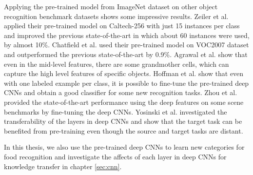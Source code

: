 Applying the pre-trained model from ImageNet dataset on other object recognition benchmark datasets shows some impressive results. Zeiler et al.  \cite{zeiler2014visualizing} applied their pre-trained model on Caltech-256 with just 15 instances per class and improved the previous state-of-the-art in which about 60 instances were used, by almost 10\%.
Chatfield et al.  \cite{Chatfield14} used their pre-trained model on VOC2007 dataset and outperformed the previous state-of-the-art by 0.9\%.
Agrawal et al. \cite{agrawal2014analyzing} show that even in the mid-level features, there are some grandmother cells, which can capture the high level features of specific objects. Hoffman et al. \cite{hoffman2013one} show that even with one labeled example per class, it is possible to fine-tune the pre-trained deep CNNs and obtain a good classifier for some new recognition tasks. Zhou et al. \cite{NIPS2014_Zhou} provided the state-of-the-art performance using the deep features on some scene benchmarks by fine-tuning the deep CNNs. Yosinski et al. \cite{yosinski2014transferable} investigated the transferability of the layers in deep CNNs and show that the target task can be benefited from pre-training even though the source and target tasks are distant. 

In this thesis, we also use the pre-trained deep CNNs to learn new categories for food recognition and investigate the affects of each layer in deep CNNs for knowledge transfer in chapter \ref{sec:cnn}.